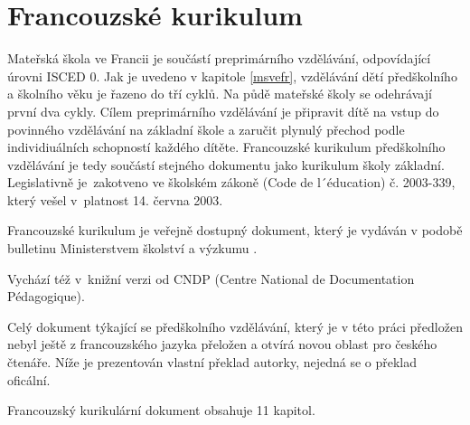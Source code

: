 	\section{Francouzské kurikulum}

		Mateřská škola ve Francii je součástí preprimárního vzdělávání, odpovídající úrovni ISCED 0. Jak je uvedeno v kapitole \ref{msvefr}, vzdělávání dětí předškolního a školního věku je řazeno do tří cyklů. Na půdě mateřské školy se odehrávají první dva cykly. Cílem preprimárního vzdělávání je připravit dítě na vstup do povinného vzdělávání na základní škole a  zaručit plynulý přechod podle individiuálních schopností každého dítěte. Francouzské kurikulum předškolního vzdělávání je tedy součástí stejného dokumentu jako kurikulum školy základní. Legislativně je zakotveno ve školském zákoně (Code de l´éducation) č. 2003-339, který vešel v platnost 14. června 2003.
	
		Francouzské kurikulum je veřejně dostupný dokument, který je vydáván v podobě bulletinu Ministerstvem školství a výzkumu \citep{buletin}.

		Vychází též v knižní verzi od CNDP (Centre National de Documentation Pédagogique)\citep{CNDP}.

		Celý dokument týkající se předškolního vzdělávání, který je v této práci předložen nebyl ještě z francouzského jazyka přeložen a otvírá novou oblast pro českého čtenáře. Níže je prezentován vlastní překlad autorky, nejedná se o překlad oficální. 

		Francouzský kurikulární dokument obsahuje 11 kapitol. 

